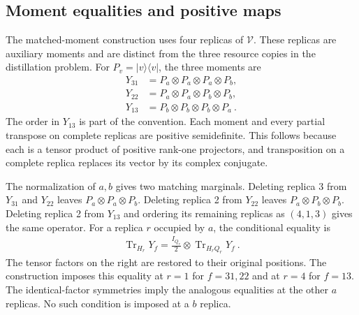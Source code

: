 \documentclass[aps,pra,reprint,superscriptaddress,amsmath,amssymb,floatfix,nofootinbib]{revtex4-2}
\newcommand{\Tr}{\operatorname{Tr}}
\begin{document}
\subsection{Moment equalities and positive maps}

The matched-moment construction uses four replicas of $\mathcal V$.
These replicas are auxiliary moments and are distinct from the three
resource copies in the distillation problem.
For $P_v=|v\rangle\langle v|$, the three moments are
\begin{align}
 Y_{31}&=P_a\otimes P_a\otimes P_a\otimes P_b,\nonumber\\
 Y_{22}&=P_a\otimes P_a\otimes P_b\otimes P_b,\nonumber\\
 Y_{13}&=P_b\otimes P_b\otimes P_b\otimes P_a\ .
 \label{eq:moments}
\end{align}
The order in $Y_{13}$ is part of the convention.
Each moment and every partial transpose on complete replicas are
positive semidefinite. This follows because each is a tensor product
of positive rank-one projectors, and transposition on a complete replica
replaces its vector by its complex conjugate.

The normalization of $a,b$ gives two matching marginals. Deleting
replica 3 from $Y_{31}$ and $Y_{22}$ leaves $P_a\otimes P_a\otimes P_b$.
Deleting replica 2 from $Y_{22}$ leaves $P_a\otimes P_b\otimes P_b$.
Deleting replica 2 from $Y_{13}$ and ordering its remaining replicas as
$(4,1,3)$ gives the same operator.
For a replica $r$ occupied by $a$, the conditional equality is
\begin{align}
 \Tr_{H_r}Y_f
 =\frac{I_{Q_r}}2\otimes\Tr_{H_rQ_r}Y_f\ .
 \label{eq:matched-conditional}
\end{align}
The tensor factors on the right are restored to their original positions.
The construction imposes this equality at $r=1$ for $f=31,22$ and at
$r=4$ for $f=13$. The identical-factor symmetries imply the analogous
equalities at the other $a$ replicas. No such condition is imposed at a
$b$ replica.
\end{document}

